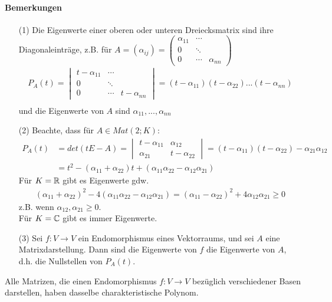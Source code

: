 \paragraph{Bemerkungen}
\begin{itemize}
 \item[(1)] Die Eigenwerte einer oberen oder unteren Dreiecksmatrix sind ihre Diagonaleinträge, z.B. für $A = (\alpha_{ij}) =  \begin{pmatrix} \alpha_{11} & \cdots & \\ 0 & \ddots & \\ 0 & \cdots & \alpha_{nn} \end{pmatrix}$
\begin{align}
P_A(t) = \begin{vmatrix} t-\alpha_{11} & \cdots & \\ 0 & \ddots & \\ 0 & \cdots & t-\alpha_{nn}\end{vmatrix} = (t-\alpha_{11}) (t - \alpha_{22}) ... (t -  \alpha_{nn}) \\
\end{align}
und die Eigenwerte von $A$ sind $\alpha_{11}, ..., \alpha_{nn}$
 \item[(2)] Beachte, dass für $A \in Mat(2;K)$:
\begin{align}
P_A(t) &= det(t E - A) = \begin{vmatrix} t-\alpha_{11} & \alpha_{12} \\ \alpha_{21} & t-\alpha_{22} \end{vmatrix} = (t -  \alpha_{11}) (t - \alpha_{22}) - \alpha_{21}\alpha_{12} \\
&= t^2 - (\alpha_{11} + \alpha_{22}) t + (\alpha_{11}\alpha_{22} - \alpha_{12} \alpha_{21})
\end{align}
Für $K = \mathbb{R}$ gibt es Eigenwerte gdw.
\begin{align}
(\alpha_{11} + \alpha_{22})^2 - 4(\alpha_{11}\alpha_{22} - \alpha_{12}\alpha_{21}) = (\alpha_{11} - \alpha_{22})^2 + 4 \alpha_{12} \alpha_{21} \geq 0
\end{align}
z.B. wenn $\alpha_{12}, \alpha_{21} \geq 0$.\\
Für $K = \mathbb{C}$ gibt es immer Eigenwerte.
 \item[(3)] Sei $f: V \rightarrow V$ ein Endomorphismus eines Vektorraums, und sei $A$ eine Matrixdarstellung. Dann sind die Eigenwerte von $f$ die Eigenwerte von $A$, d.h. die Nullstellen von $P_A(t)$.
\end{itemize}

\begin{satz} %
\label{satz232}
Alle Matrizen, die einen Endomorphismus $f: V \rightarrow V$ bezüglich verschiedener Basen darstellen, haben dasselbe charakteristische Polynom.
\end{satz}

